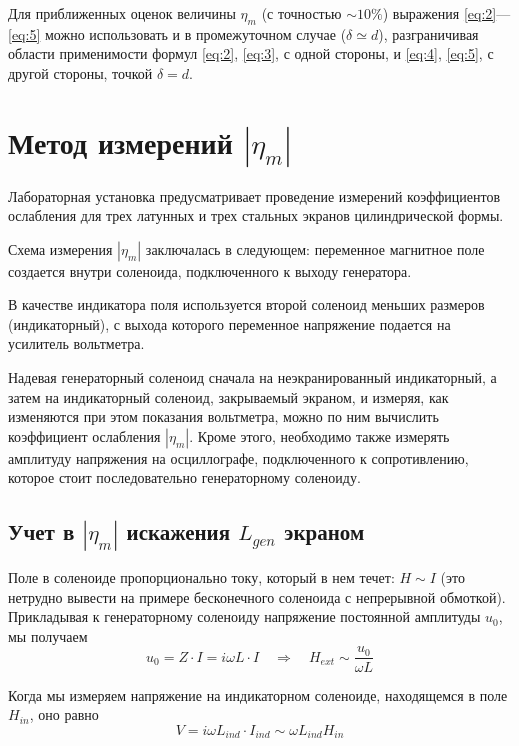 \documentclass[a4paper,12pt]{article}
\begin{document}
Для приближенных оценок величины $\eta_{m}$ (с точностью $\sim10\%$) выражения \eqref{eq:2}—\eqref{eq:5} можно использовать и в промежуточном случае ($\delta \simeq d$), разграничивая области применимости формул \eqref{eq:2}, \eqref{eq:3}, с одной стороны, и \eqref{eq:4}, \eqref{eq:5}, с другой стороны, точкой $\delta = d$.

\section{Метод измерений $|\eta_m|$}

Лабораторная установка предусматривает проведение измерений коэффициентов ослабления для трех латунных и трех стальных экранов цилиндрической формы. 

Схема измерения $|\eta_m|$ заключалась в следующем: переменное магнитное поле создается внутри соленоида, подключенного к выходу генератора. 

В качестве индикатора поля используется второй соленоид меньших размеров (индикаторный), с выхода которого переменное напряжение подается на усилитель вольтметра. 

Надевая генераторный соленоид сначала на неэкранированный индикаторный, а затем на индикаторный соленоид, закрываемый экраном, и измеряя, как изменяются при этом показания вольтметра, можно по ним вычислить коэффициент ослабления $|\eta_m|$. Кроме этого, необходимо также измерять амплитуду напряжения на осциллографе, подключенного к сопротивлению, которое стоит последовательно генераторному соленоиду.

\subsection{Учет в $|\eta_m|$ искажения $L_{gen}$ экраном}

Поле в соленоиде пропорционально току, который в нем течет: $H\sim I$ (это нетрудно вывести на примере бесконечного соленоида с непрерывной обмоткой). Прикладывая к генераторному соленоиду напряжение постоянной амплитуды $u_0$, мы получаем
\begin{equation}
	u_0=Z\cdot I=i\omega L\cdot I \quad\Rightarrow\quad H_{ext}\sim \frac{u_0}{\omega L}
\end{equation}

Когда мы измеряем напряжение на индикаторном соленоиде, находящемся в поле $H_{in}$, оно равно 
\begin{equation}
	V=i\omega L_{ind}\cdot I_{ind} \sim \omega  L_{ind} H_{in}
\end{equation}
\end{document}
